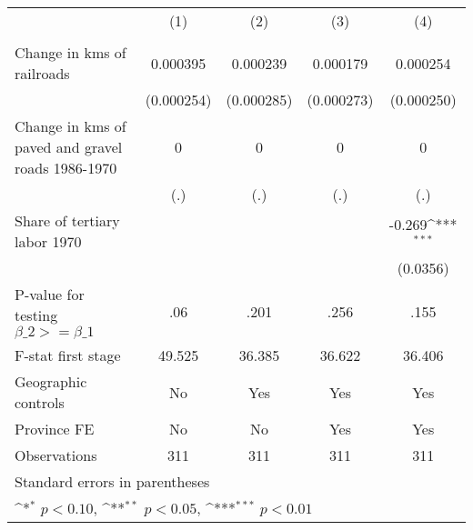 {
\def\sym#1{\ifmmode^{#1}\else\(^{#1}\)\fi}
\begin{tabular}{l*{4}{c}}
\hline\hline
                &\multicolumn{1}{c}{(1)}&\multicolumn{1}{c}{(2)}&\multicolumn{1}{c}{(3)}&\multicolumn{1}{c}{(4)}\\
                &\multicolumn{1}{c}{}&\multicolumn{1}{c}{}&\multicolumn{1}{c}{}&\multicolumn{1}{c}{}\\
\hline
Change in kms of railroads& 0.000395         & 0.000239         & 0.000179         & 0.000254         \\
                &(0.000254)         &(0.000285)         &(0.000273)         &(0.000250)         \\
[1em]
Change in kms of paved and gravel roads 1986-1970&        0         &        0         &        0         &        0         \\
                &      (.)         &      (.)         &      (.)         &      (.)         \\
[1em]
Share of tertiary labor 1970&                  &                  &                  &   -0.269\sym{***}\\
                &                  &                  &                  & (0.0356)         \\
\hline
P-value for testing $\beta\_{2} >= \beta\_{1}$&      .06         &     .201         &     .256         &     .155         \\
F-stat first stage&   49.525         &   36.385         &   36.622         &   36.406         \\
Geographic controls&       No         &      Yes         &      Yes         &      Yes         \\
Province FE     &       No         &       No         &      Yes         &      Yes         \\
Observations    &      311         &      311         &      311         &      311         \\
\hline\hline
\multicolumn{5}{l}{\footnotesize Standard errors in parentheses}\\
\multicolumn{5}{l}{\footnotesize \sym{*} \(p<0.10\), \sym{**} \(p<0.05\), \sym{***} \(p<0.01\)}\\
\end{tabular}
}
